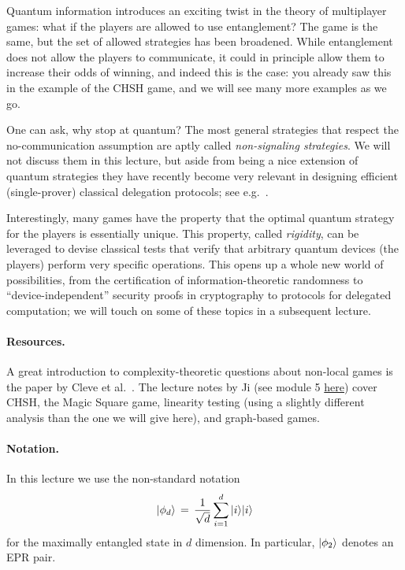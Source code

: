 Quantum information introduces an exciting twist in the theory of multiplayer games: what if the players are allowed to use entanglement? The game is the same, but the set of allowed strategies has been broadened. While entanglement does not allow the players to communicate,  it could in principle allow them to increase their odds of winning, and indeed this is the case: you already saw this in the example of the CHSH game, and we will see many more examples as we go. 

\begin{remark}
One can ask, why stop at quantum? The most general strategies that respect the no-communication assumption are aptly called \emph{non-signaling strategies}. We will not discuss them in this lecture, but aside from being a nice extension of quantum strategies they have recently become very relevant in designing efficient (single-prover) classical delegation protocols; see e.g.~\cite{kalai2014delegate}.
\end{remark} 

Interestingly, many games have the property that the optimal quantum strategy for the players is essentially unique. This property, called \emph{rigidity}, can be leveraged to devise classical tests that verify that arbitrary quantum devices (the players) perform very specific operations. This opens up a whole new world of possibilities, from the certification of information-theoretic randomness to ``device-independent'' security proofs in cryptography to protocols for delegated computation; we will touch on some of these topics in a subsequent lecture. 

\paragraph{Resources.} A great introduction to complexity-theoretic questions about non-local games is the paper by Cleve et al.~\cite{cleve2004consequences}. The lecture notes by Ji (see module 5 \href{https://uwaterloo.ca/institute-for-quantum-computing/programs/graduate-studies/previous-courses/qic-890891-selected-advanced-topics-quantum-information}{here}) cover CHSH, the Magic Square game, linearity testing (using a slightly different analysis than the one we will give here), and graph-based games. 

\paragraph{Notation.} In this lecture we use the non-standard notation 
\begin{equation}\label{eq:me-state}
 |\phi_d\rangle \,=\,\frac{1}{\sqrt{d}} \sum_{i=1}^d |i\rangle|i\rangle
\end{equation}
for the maximally entangled state in $d$ dimension. In particular, $|\phi_2\rangle$ denotes an EPR pair. 